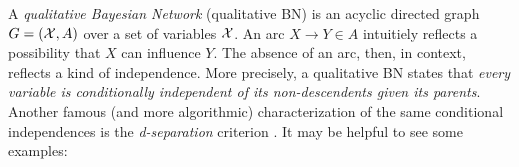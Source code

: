A \emph{qualitative Bayesian Network} (qualitative BN) is an acyclic directed graph $G = (\mathcal X, A)$ over a set of variables $\mathcal X$. 
An arc $X {\to} Y \in A$ intuitiely reflects a possibility that $X$ can influence $Y$. 
The absence of an arc, then, in context, reflects a kind of independence. 
More precisely, a qualitative BN states that
\textit{every variable is conditionally independent of its non-descendents given its parents}.
Another famous (and more algorithmic) characterization of the same conditional independences is the \emph{d-separation} criterion  \citep{geiger-pearl-d-separation}. 
It may be helpful to see some examples:

\begin{center}
    \def\XYZnodes{%
        \node[bnnode] (X) at (0,-1) {$X$};
        \node[bnnode] (Y) at (0,0) {$Y$};
        \node[bnnode] (Z) at (0,1) {$Z$};
    }
    ~~~
    ~~~
    \hspace{2cm}
\end{center}

